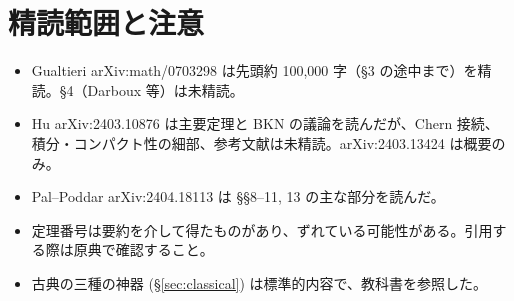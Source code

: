 \documentclass[11pt,a4paper]{article}
\theoremstyle{definition}
\begin{document}
\section{精読範囲と注意}\label{sec:cov}
\begin{itemize}
\item Gualtieri arXiv:math/0703298 は先頭約 100,000 字（\S3 の途中まで）を精読。\S4（Darboux 等）は未精読。
\item Hu arXiv:2403.10876 は主要定理と BKN の議論を読んだが、Chern 接続、積分・コンパクト性の細部、参考文献は未精読。arXiv:2403.13424 は概要のみ。
\item Pal--Poddar arXiv:2404.18113 は \S\S 8--11, 13 の主な部分を読んだ。
\item 定理番号は要約を介して得たものがあり、ずれている可能性がある。引用する際は原典で確認すること。
\item 古典の三種の神器 (\S\ref{sec:classical}) は標準的内容で、教科書を参照した。
\end{itemize}
\end{document}
